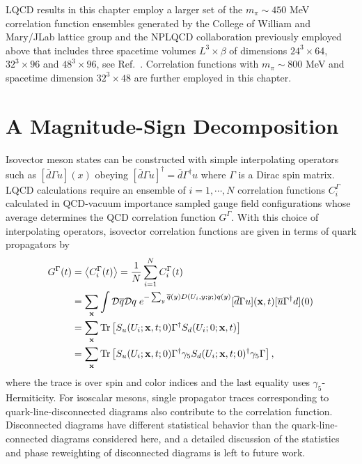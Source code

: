 LQCD results in this chapter employ a larger set of the $m_\pi \sim 450$ MeV correlation function ensembles generated by the College of William and Mary/JLab lattice group and the NPLQCD collaboration previously employed above that includes three spacetime volumes $L^3\times \beta$ of dimensions $24^3\times 64$, $32^3 \times 96$ and $48^3\times 96$, see Ref.~\cite{Orginos:2015aya}. Correlation functions with $m_\pi \sim 800$ MeV and spacetime dimension $32^3 \times 48$ are further employed in this chapter.

\section{A Magnitude-Sign Decomposition}

Isovector meson states can be constructed with simple interpolating operators such as $[\bar{d}\Gamma u](x)$ obeying $[\bar{d}\Gamma u]^\dagger = \bar{d} \Gamma^\dagger u$ where $\Gamma$ is a Dirac spin matrix. 
LQCD calculations require an ensemble of $i=1,\cdots,N$ correlation functions $C_i^\Gamma$ calculated in QCD-vacuum importance sampled gauge field configurations whose average determines the QCD correlation function $G^\Gamma$.
With this choice of interpolating operators, isovector correlation functions are given in terms of quark propagators by
\begin{equation}
  \begin{split}
    G^\Gamma (t) &= \left< C_i^\Gamma(t) \right> = \frac{1}{N}\sum_{i=1}^N C_i^\Gamma(t) \\ 
    &= \sum_{\mathbf{x}} \int \mathcal{D}\overline{q}\mathcal{D}q\; e^{-\sum_y \overline{q}(y)D(U_i,y;y;)q(y)} [\overline{d}\Gamma u](\mathbf{x},t) [\overline{u} \Gamma^\dagger d](0)\\
    &= \sum_{\mathbf{x}} \text{Tr}\left[ S_u(U_i;\mathbf{x},t;0)\Gamma^\dagger S_d(U_i;0;\mathbf{x},t) \right]  \\
    &= \sum_{\mathbf{x}} \text{Tr}\left[ S_u(U_i;\mathbf{x},t;0)\Gamma^\dagger \gamma_5 S_d(U_i;\mathbf{x},t;0)^\dagger \gamma_5 \Gamma \right] ,
  \end{split}\label{Cdef}
\end{equation}
where the trace is over spin and color indices and the last equality uses $\gamma_5$-Hermiticity.
For isoscalar mesons, single propagator traces corresponding to quark-line-disconnected diagrams also contribute to the correlation function. 
Disconnected diagrams have different statistical behavior than the quark-line-connected diagrams considered here, and a detailed discussion of the statistics and phase reweighting of disconnected diagrams is left to future work. 
